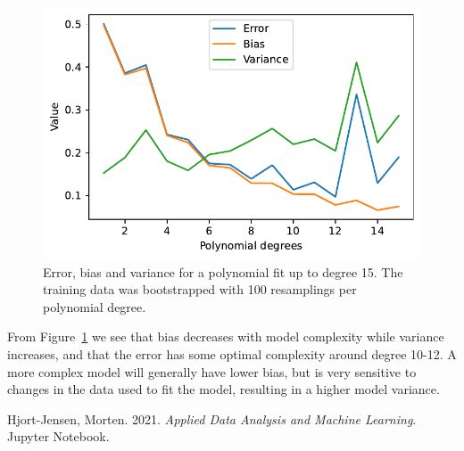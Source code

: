 \documentclass[
  letterpaper,
  DIV=11,
  numbers=noendperiod]{scrartcl}
\newlength{\cslhangindent}
\newlength{\cslentryspacingunit} %
\newenvironment{CSLReferences}[2] %
 {%
  \setlength{\parindent}{0pt}
  \ifodd #1
  \let\oldpar\par
  \def\par{\hangindent=\cslhangindent\oldpar}
  \fi
  \setlength{\parskip}{#2\cslentryspacingunit}
 }%
 {}
\begin{document}
\begin{figure}[H]

{\centering \includegraphics{w38-exercises_files/figure-pdf/fig-bias-var-output-1.pdf}

}

\caption{\label{fig-bias-var}Error, bias and variance for a polynomial
fit up to degree 15. The training data was bootstrapped with 100
resamplings per polynomial degree.}

\end{figure}

From Figure~\ref{fig-bias-var} we see that bias decreases with model
complexity while variance increases, and that the error has some optimal
complexity around degree 10-12. A more complex model will generally have
lower bias, but is very sensitive to changes in the data used to fit the
model, resulting in a higher model variance.

\hypertarget{refs}{}
\begin{CSLReferences}{1}{0}
\leavevmode{}%
Hjort-Jensen, Morten. 2021. \emph{Applied Data Analysis and Machine
Learning}. Jupyter Notebook.

\end{CSLReferences}
\end{document}
